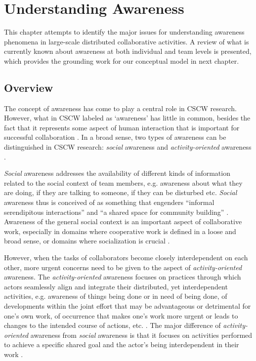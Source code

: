 \graphicspath{{Figures/}}
\chapter{Understanding Awareness} %
\label{cha:understanding_awareness}
This chapter attempts to identify the major issues for understanding awareness phenomena in large-scale distributed collaborative activities. A review of what is currently known about awareness at both individual and team levels is presented, which provides the grounding work for our conceptual model in next chapter.
\section{Overview} %
\label{sec:overview}
The concept of awareness has come to play a central role in CSCW research. However, what in CSCW labeled as `awareness' has little in common, besides the fact that it represents some aspect of human interaction that is important for successful collaboration \cite{schmidt2002a}. In a broad sense, two types of awareness can be distinguished in CSCW research: \emph{social} awareness and \emph{activity-oriented} awareness \cite{prinz1999a,schmidt2002a,carroll2003a}.

\emph{Social} awareness addresses the availability of different kinds of information related to the social context of team members, e.g. awareness about what they are doing, if they are talking to someone, if they can be disturbed etc. \emph{Social} awareness thus is conceived of as something that engenders ``informal serendipitous interactions'' \cite{hudson1996a} and ``a shared space for community building'' \cite{Dourish1992}. Awareness of the general social context is an important aspect of collaborative work, especially in domains where cooperative work is defined in a loose and broad sense, or domains where socialization is crucial \cite{schmidt2002a}.

However, when the tasks of collaborators become closely interdependent on each other, more urgent concerns need to be given to the aspect of \emph{activity-oriented} awareness. The \emph{activity-oriented} awareness focuses on practices through which actors seamlessly align and integrate their distributed, yet interdependent activities, e.g. awareness of things being done or in need of being done, of developments within the joint effort that may be advantageous or detrimental for one's own work, of occurrence that makes one's work more urgent or leads to changes to the intended course of actions, etc. \cite{schmidt2002a}. The major difference of \emph{activity-oriented} awareness from \emph{social} awareness is that it focuses on activities performed to achieve a specific shared goal \cite{carroll2003a} and the actor's being interdependent in their work \cite{schmidt2002a}.

